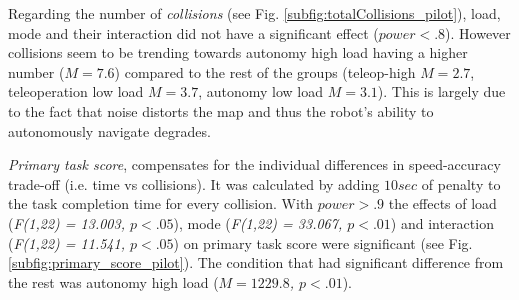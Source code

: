 \documentclass[a4paper,12pt,oneside,openright]{bhamthesis}
\begin{document}
Regarding the number of \textit{collisions} (see Fig. \ref{subfig:totalCollisions_pilot}), load, mode and their interaction did not have a significant effect (\textit{$power < .8$}). However collisions seem to be trending towards autonomy high load having a higher number (\textit{$M = 7.6$}) compared to the rest of the groups (teleop-high \textit{$M = 2.7$}, teleoperation low load \textit{$M = 3.7$}, autonomy low load \textit{$M = 3.1$}). This is largely due to the fact that noise distorts the map and thus the robot's ability to autonomously navigate degrades.  

\textit{Primary task score}, compensates for the individual differences in speed-accuracy trade-off (i.e. time vs collisions). It was calculated by adding \textit{$10 sec$} of penalty to the task completion time for every collision. With \textit{$power > .9$} the effects of load (\textit{F(1,22) = 13.003,  $p < .05$}), mode (\textit{F(1,22) = 33.067, $p < .01$}) and interaction (\textit{F(1,22) = 11.541, $p < .05$}) on primary task score were significant (see Fig. \ref{subfig:primary_score_pilot}). The condition that had significant difference from the rest was autonomy high load (\textit{$M = 1229.8$, $p < .01$}).
 
\end{document}
